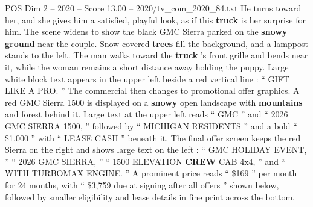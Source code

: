 \begin{textsample}{POS Dim 2 – 2020 – Score 13.00 – 2020/tv\_com\_2020\_84.txt}
He turns toward her, and she gives him a satisfied, playful look, as if this \textbf{truck} is her surprise for him.
The scene widens to show the black GMC Sierra parked on the \textbf{snowy} \textbf{ground} near the couple.
Snow-covered \textbf{trees} fill the background, and a lamppost stands to the left.
The man walks toward the \textbf{truck} ’s front grille and bends near it, while the woman remains a short distance away holding the puppy.
Large white block text appears in the upper left beside a red vertical line : “ GIFT LIKE A PRO. ” The commercial then changes to promotional offer graphics.
A red GMC Sierra 1500 is displayed on a \textbf{snowy} open landscape with \textbf{mountains} and forest behind it.
Large text at the upper left reads “ GMC ” and “ 2026 GMC SIERRA 1500, ” followed by “ MICHIGAN RESIDENTS ” and a bold “ \$1,000 ” with “ LEASE CASH ” beneath it.
The final offer screen keeps the red Sierra on the right and shows large text on the left : “ GMC HOLIDAY EVENT, ” “ 2026 GMC SIERRA, ” “ 1500 ELEVATION \textbf{CREW} CAB 4x4, ” and “ WITH TURBOMAX ENGINE. ” A prominent price reads “ \$169 ” per month for 24 months, with “ \$3,759 due at signing after all offers ” shown below, followed by smaller eligibility and lease details in fine print across the bottom.

\end{textsample}
